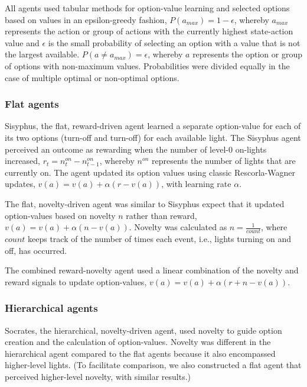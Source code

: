 \documentclass{article}
\begin{document}
All agents used tabular methods for option-value learning and selected options based on values in an epsilon-greedy fashion, $P(a_{max}) = 1 - \epsilon$, whereby $a_{max}$ represents the action or group of actions with the currently highest state-action value and $\epsilon$ is the small probability of selecting an option with a value that is not the largest available. $P(a \neq a_{max}) = \epsilon$, whereby $a$ represents the option or group of options with non-maximum values. Probabilities were divided equally in the case of multiple optimal or non-optimal options. 


\subsubsection{Flat agents}

Sisyphus, the flat, reward-driven agent learned a separate option-value for each of its two options (turn-off and turn-off) for each available light. The Sisyphus agent perceived an outcome as rewarding when the number of level-0 on-lights increased, $r_t = n_t^{on} - n_{t-1}^{on}$, whereby $n^{on}$ represents the number of lights that are currently on. The agent updated its option values using classic Rescorla-Wagner updates, $v(a) = v(a) + \alpha (r - v(a))$, with learning rate $\alpha$.

The flat, novelty-driven agent was similar to Sisyphus expect that it updated option-values based on novelty $n$ rather than reward, $v(a) = v(a) + \alpha (n - v(a))$. Novelty was calculated as $n = \frac{1}{count}$, where $count$ keeps track of the number of times each event, i.e., lights turning on and off, has occurred. 

The combined reward-novelty agent used a linear combination of the novelty and reward signals to update option-values, $v(a) = v(a) + \alpha (r + n - v(a))$. 


\subsubsection{Hierarchical agents}

Socrates, the hierarchical, novelty-driven agent, used novelty to guide option creation and the calculation of option-values. Novelty was different in the hierarchical agent compared to the flat agents because it also encompassed higher-level lights. (To facilitate comparison, we also constructed a flat agent that perceived higher-level novelty, with similar results.)
\end{document}

